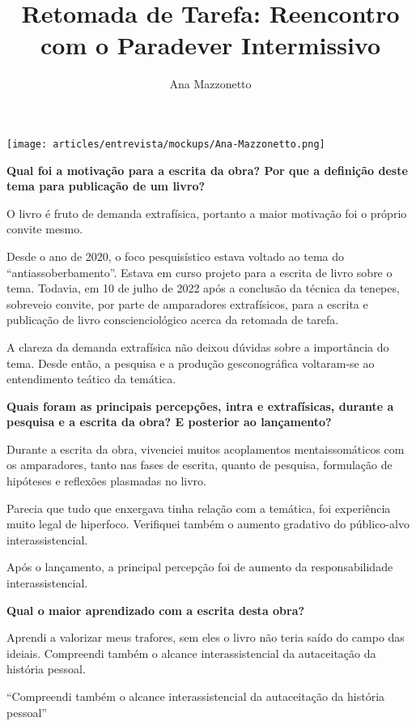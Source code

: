 \documentclass{gescons}
\author{Ana Mazzonetto}
\title{Retomada de Tarefa: Reencontro com o Paradever Intermissivo}
\begin{document}
    \makeentrevistatitle


    \begin{multicols}{2}


\begin{center}

    \texttt{[image: articles/entrevista/mockups/Ana-Mazzonetto.png]}
\end{center}

\textbf{Qual foi a motivação para a escrita da obra? Por que a definição deste tema para publicação de um livro?}

O livro é fruto de demanda extrafísica, portanto a maior motivação foi o próprio convite mesmo. 

Desde o ano de 2020, o foco pesquisístico estava voltado ao tema do “antiassoberbamento”. Estava em curso projeto para a escrita de livro sobre o tema. Todavia, em 10 de julho de 2022 após a conclusão da técnica da tenepes, sobreveio convite, por parte de amparadores extrafísicos, para a escrita e publicação de livro conscienciológico acerca da retomada de tarefa. 

A clareza da demanda extrafísica não deixou dúvidas sobre a importância do tema. Desde então, a pesquisa e a produção gesconográfica voltaram-se ao entendimento teático da temática.

\textbf{Quais foram as principais percepções, intra e extrafísicas, durante a pesquisa e a escrita da obra? E posterior ao lançamento?}

Durante a escrita da obra, vivenciei muitos acoplamentos mentaissomáticos com os amparadores, tanto nas fases de escrita, quanto de pesquisa, formulação de hipóteses e reflexões plasmadas no livro. 

Parecia que tudo que enxergava tinha relação com a temática, foi experiência muito legal de hiperfoco. Verifiquei também o aumento gradativo do público-alvo interassistencial.

Após o lançamento, a principal percepção foi de aumento da responsabilidade interassistencial. 

\textbf{Qual o maior aprendizado com a escrita desta obra?}

Aprendi a valorizar meus trafores, sem eles o livro não teria saído do campo das ideiais. Compreendi também o alcance interassistencial da autaceitação da história pessoal.

\begin{pullquote}
``Compreendi também o alcance interassistencial da autaceitação da história pessoal''
\end{pullquote}



\end{multicols}
\end{document}
